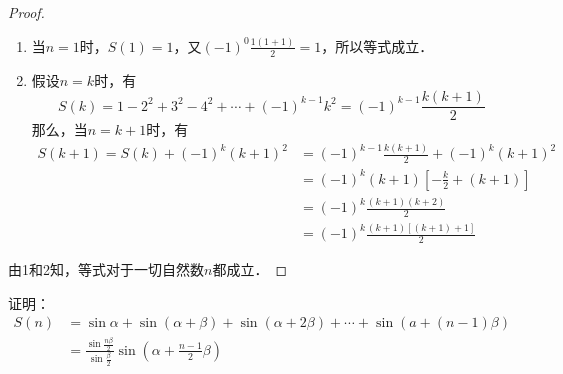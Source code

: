 \begin{proof}
\begin{enumerate}
    \item 当$n=1$时，$S(1)=1$，又$(-1)^0\frac{1(1+1)}{2}=1$，所以等式成立．

\item 假设$n=k$时，有
\[S(k)=1-2^2+3^2-4^2+\cdots+(-1)^{k-1}k^2=(-1)^{k-1}\frac{k(k+1)}{2}\]
那么，当$n=k+1$时，有    
\[\begin{split}
    S(k+1)=S(k)+(-1)^k(k+1)^2&=(-1)^{k-1}\frac{k(k+1)}{2}+(-1)^k(k+1)^2\\
    &=(-1)^k(k+1)\left[-\frac{k}{2}+(k+1)\right]\\
    &=(-1)^k \frac{(k+1)(k+2)}{2}\\
    &=(-1)^k \frac{(k+1)[(k+1)+1]}{2}
\end{split}\]
\end{enumerate}

由1和2知，等式对于一切自然数$n$都成立．
\end{proof}


\begin{example}
证明：
\[\begin{split}
    S(n)&= \sin \alpha+\sin (\alpha+\beta)+\sin (\alpha+2 \beta)+\cdots+\sin (a+(n-1) \beta) \\
&= \frac{\sin \frac{n \beta}{2}}{\sin \frac{\beta}{2}} \sin \left(\alpha+\frac{n-1}{2} \beta\right)
\end{split}\]
\end{example}

